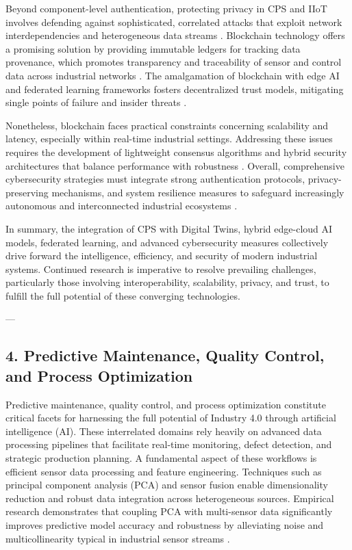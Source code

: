 \documentclass[11pt]{article}
\begin{document}
Beyond component-level authentication, protecting privacy in CPS and IIoT involves defending against sophisticated, correlated attacks that exploit network interdependencies and heterogeneous data streams \cite{ref15}. Blockchain technology offers a promising solution by providing immutable ledgers for tracking data provenance, which promotes transparency and traceability of sensor and control data across industrial networks \cite{ref20}. The amalgamation of blockchain with edge AI and federated learning frameworks fosters decentralized trust models, mitigating single points of failure and insider threats \cite{ref22}.

Nonetheless, blockchain faces practical constraints concerning scalability and latency, especially within real-time industrial settings. Addressing these issues requires the development of lightweight consensus algorithms and hybrid security architectures that balance performance with robustness \cite{ref31}. Overall, comprehensive cybersecurity strategies must integrate strong authentication protocols, privacy-preserving mechanisms, and system resilience measures to safeguard increasingly autonomous and interconnected industrial ecosystems \cite{ref32}.

\bigskip

\noindent In summary, the integration of CPS with Digital Twins, hybrid edge-cloud AI models, federated learning, and advanced cybersecurity measures collectively drive forward the intelligence, efficiency, and security of modern industrial systems. Continued research is imperative to resolve prevailing challenges, particularly those involving interoperability, scalability, privacy, and trust, to fulfill the full potential of these converging technologies.


---

\subsection{4. Predictive Maintenance, Quality Control, and Process Optimization}

Predictive maintenance, quality control, and process optimization constitute critical facets for harnessing the full potential of Industry 4.0 through artificial intelligence (AI). These interrelated domains rely heavily on advanced data processing pipelines that facilitate real-time monitoring, defect detection, and strategic production planning. A fundamental aspect of these workflows is efficient sensor data processing and feature engineering. Techniques such as principal component analysis (PCA) and sensor fusion enable dimensionality reduction and robust data integration across heterogeneous sources. Empirical research demonstrates that coupling PCA with multi-sensor data significantly improves predictive model accuracy and robustness by alleviating noise and multicollinearity typical in industrial sensor streams \cite{ref30,ref33}.
\end{document}
